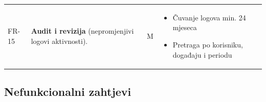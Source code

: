 \documentclass{article}
\begin{document}
\begin{longtable}{|L{1.6cm}|L{8.0cm}|C{0.9cm}|L{6.2cm}|}
\begin{minipage}[t]{6.2cm}
\end{minipage} \\
\hline
FR-15 & \textbf{Audit i revizija} (nepromjenjivi logovi aktivnosti). & M &
\begin{minipage}[t]{6.2cm}\vspace{2pt}
\begin{itemize}\setlength\itemsep{2pt}
    \item Čuvanje logova min. 24 mjeseca
    \item Pretraga po korisniku, događaju i periodu
\end{itemize}\vspace{2pt}
\end{minipage} \\
\hline
\end{longtable}

\subsection{Nefunkcionalni zahtjevi}
\end{document}
